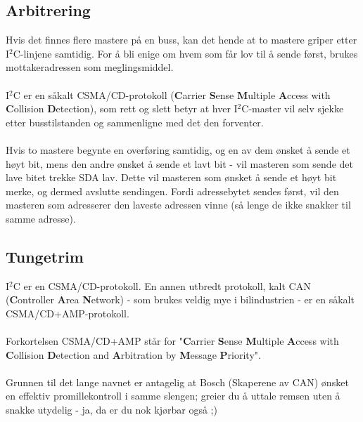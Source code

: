\documentclass[11pt,a4paper]{article}
\begin{document}
\subsection*{Arbitrering}
Hvis det finnes flere mastere på en buss, kan det hende at to mastere griper etter I$^2$C-linjene samtidig. For å bli enige om hvem som får lov til å sende først, brukes mottakeradressen som meglingsmiddel.\\
\\
I$^2$C er en såkalt CSMA/CD-protokoll (\textbf{C}arrier \textbf{S}ense \textbf{M}ultiple \textbf{A}ccess with \textbf{C}ollision \textbf{D}etection), som rett og slett betyr at hver I$^2$C-master vil selv sjekke etter busstilstanden og sammenligne med det den forventer.\\
\\
Hvis to mastere begynte en overføring samtidig, og en av dem ønsket å sende et høyt bit, mens den andre ønsket å sende et lavt bit - vil masteren som sende det lave bitet trekke SDA lav. Dette vil masteren som ønsket å sende et høyt bit merke, og dermed avslutte sendingen. Fordi adressebytet sendes først, vil den masteren som adresserer den laveste adressen vinne (så lenge de ikke snakker til samme adresse).

\subsection*{Tungetrim}
I$^2$C er en CSMA/CD-protokoll. En annen utbredt protokoll, kalt CAN (\textbf{C}ontroller \textbf{A}rea \textbf{N}etwork) - som brukes veldig mye i bilindustrien - er en såkalt CSMA/CD+AMP-protokoll.\\
\\
Forkortelsen CSMA/CD+AMP står for "\textbf{C}arrier \textbf{S}ense \textbf{M}ultiple \textbf{A}ccess with \textbf{C}ollision \textbf{D}etection and \textbf{A}rbitration by \textbf{M}essage \textbf{P}riority".\\
\\
Grunnen til det lange navnet er antagelig at Bosch (Skaperene av CAN) ønsket en effektiv promillekontroll i samme slengen; greier du å uttale remsen uten å snakke utydelig - ja, da er du nok kjørbar også ;)
\end{document}
